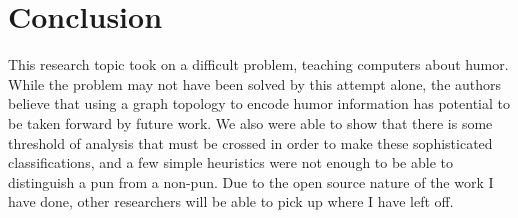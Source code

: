 
\section{Conclusion}

This research topic took on a difficult problem, teaching computers about humor. While the problem may not have been solved by this attempt alone, the authors believe that using a graph topology to encode humor information has potential to be taken forward by future work. We also were able to show that there is some threshold of analysis that must be crossed in order to make these sophisticated classifications, and a few simple heuristics were not enough to be able to distinguish a pun from a non-pun. Due to the open source nature of the work I have done, other researchers will be able to pick up where I have left off.